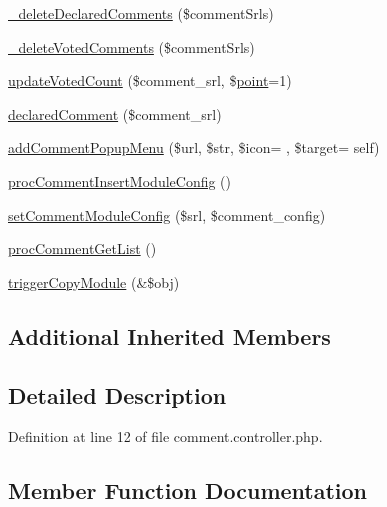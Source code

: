 \begin{DoxyCompactItemize}
\item 
\hyperlink{classcommentController_a06a2f96cd357550dd0cd834d7e61f4bf}{\+\_\+delete\+Declared\+Comments} (\$comment\+Srls)
\item 
\hyperlink{classcommentController_a0e4216451f3bb1c02aeec98bb4f54ddc}{\+\_\+delete\+Voted\+Comments} (\$comment\+Srls)
\item 
\hyperlink{classcommentController_abe720cae94b04ba356b00f80f6880e91}{update\+Voted\+Count} (\$comment\+\_\+srl, \$\hyperlink{classpoint}{point}=1)
\item 
\hyperlink{classcommentController_aaae1e5860a1e170a8fc3142f80bbcde6}{declared\+Comment} (\$comment\+\_\+srl)
\item 
\hyperlink{classcommentController_a27025d0f5cc53f58566493e6e33b924a}{add\+Comment\+Popup\+Menu} (\$url, \$str, \$icon= \textquotesingle{}\textquotesingle{}, \$target= \textquotesingle{}self\textquotesingle{})
\item 
\hyperlink{classcommentController_ab4a71283244210be754cceb8511e8789}{proc\+Comment\+Insert\+Module\+Config} ()
\item 
\hyperlink{classcommentController_a3e4d45ad61f74541e1182c29924b625d}{set\+Comment\+Module\+Config} (\$srl, \$comment\+\_\+config)
\item 
\hyperlink{classcommentController_ac9edb9826c8b07ceb1a4db29c5db514a}{proc\+Comment\+Get\+List} ()
\item 
\hyperlink{classcommentController_a5cf1c177c5cbdd0556363a0204d92f5f}{trigger\+Copy\+Module} (\&\$obj)
\end{DoxyCompactItemize}
\subsection*{Additional Inherited Members}


\subsection{Detailed Description}


Definition at line 12 of file comment.\+controller.\+php.



\subsection{Member Function Documentation}
\hypertarget{classcommentController_a06a2f96cd357550dd0cd834d7e61f4bf}{}
